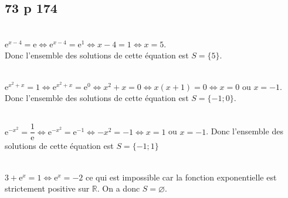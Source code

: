 \documentclass[12pt,a4paper]{book}
\begin{document}
%
\subsection*{73 p 174}
\begin{enumMet}
    \item {}\\
    $\mathrm{e}^{x-4}=\mathrm{e} \Leftrightarrow \mathrm{e}^{x-4}=\mathrm{e}^{1} \Leftrightarrow x-4=1 \Leftrightarrow x=5$.\\
    Donc l'ensemble des solutions de cette équation est $S=\{5\}$.
    \item {}\\
    $\mathrm{e}^{x^{2}+x}=1 \Leftrightarrow \mathrm{e}^{x^{2}+x}=\mathrm{e}^{0} \Leftrightarrow x^{2}+x=0 \Leftrightarrow x(x+1)=0 \Leftrightarrow x=0$ ou $x=-1$.\\
    Donc l'ensemble des solutions de cette équation est $S=\{-1 ; 0\}$.
    \item {}\\
    $\mathrm{e}^{-x^{2}}=\dfrac{1}{\mathrm{e}} \Leftrightarrow \mathrm{e}^{-x^{2}}=\mathrm{e}^{-1} \Leftrightarrow-x^{2}=-1 \Leftrightarrow x=1$ ou $x=-1$. Donc l'ensemble des solutions de cette équation est $S=\{-1 ; 1\}$
    \item {}\\
    $3+\mathrm{e}^{x}=1 \Leftrightarrow \mathrm{e}^{x}=-2$ ce qui est impossible car la fonction exponentielle est strictement positive sur $\mathbb{R}$. On a donc $S=\varnothing .$
\end{enumMet}
\end{document}
